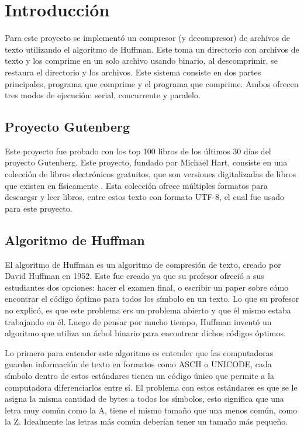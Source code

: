 \documentclass{report}
\begin{document}


\tableofcontents

\chapter{Introducción}\label{intro}

Para este proyecto se implementó un compresor (y decompresor) de archivos de texto utilizando el algoritmo de Huffman.
Este toma un directorio con archivos de texto y los comprime en un solo archivo usando binario, al descomprimir, se restaura el directorio y los archivos.
Este sistema consiste en dos partes principales,  programa que comprime y el programa que comprime.
Ambos ofrecen tres modos de ejecución: serial, concurrente y paralelo.

\section {Proyecto Gutenberg}

Este proyecto fue probado con los top 100 libros de los últimos 30 días del proyecto Gutenberg.
Este proyecto, fundado por Michael  Hart, consiste en una colección de libros electrónicos gratuitos, que son versiones digitalizadas de libros que existen en físicamente \cite{gutenberg}.
Esta colección ofrece múltiples formatos para descargsr y leer libros, entre estos texto con formato UTF-8, el cual fue usado para este proyecto.

\section{Algoritmo de Huffman}

El algoritmo de Huffman es un algoritmo de compresión de texto, creado por David Huffman en 1952. Este fue creado ya que su profesor ofreció a sus estudiantes dos opciones: hacer el examen final, o escribir un paper sobre cómo encontrar el código óptimo para todos los símbolo en un texto. Lo que su profesor no explicó,  es que este problema ers un problema abierto y que él mismo estaba trabajando en él. Luego de pensar por mucho tiempo,  Huffman inventó un algoritmo que utiliza un árbol binario para encontrear dichos códigos óptimos. 


Lo primero para entender este algoritmo es entender que las computadoras guardsn información de texto en formatos como ASCII o UNICODE, cada símbolo dentro de estos estándares tienen un código único que permite a la computadora diferenciarlos entre sí. El problema con estos estándares es que se le asigna la misma cantidad de bytes a todos los símbolos,  esto significa que una letra muy común como la A, tiene el mismo tamaño que una menos común,  como la Z. Idealmente las letras más común deberían tener un tamaño más pequeño. 
\end{document}
